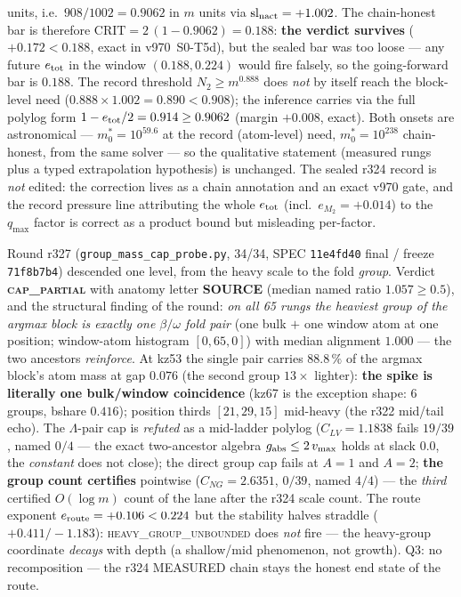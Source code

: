 \documentclass[11pt]{article}
\theoremstyle{definition}
\theoremstyle{remark}
\begin{document}
\begin{itemize}[leftmargin=2em]
units, i.e.\ $908/1002 = 0.9062$ in $m$ units via
$\mathrm{sl}_{\rm nact} = +1.002$.  The chain-honest bar is
therefore $\mathrm{CRIT} = 2\,(1 - 0.9062) = 0.188$:
\textbf{the verdict survives} ($+0.172 < 0.188$, exact in
v970~S0-T5d), but the sealed bar was too loose --- any future
$e_{\rm tot}$ in the window $(0.188, 0.224)$ would fire falsely,
so the going-forward bar is $0.188$.  The record threshold
$N_2 \ge m^{0.888}$ does \emph{not} by itself reach the
block-level need ($0.888 \times 1.002 = 0.890 < 0.908$); the
inference carries via the full polylog form $1 - e_{\rm tot}/2 =
0.914 \ge 0.9062$ (margin $+0.008$, exact).  Both onsets are
astronomical --- $m_0^* = 10^{59.6}$ at the record (atom-level)
need, $m_0^* = 10^{238}$ chain-honest, from the same solver ---
so the qualitative statement (measured rungs plus a typed
extrapolation hypothesis) is unchanged.  The sealed r324 record
is \emph{not} edited: the correction lives as a chain annotation
and an exact v970 gate, and the record pressure line attributing
the whole $e_{\rm tot}$ (incl.\ $e_{M_2} = +0.014$) to the
$q_{\max}$ factor is correct as a product bound but misleading
per-factor.
\end{itemize}

Round r327 (\texttt{group\_mass\_cap\_probe.py}, 34/34, SPEC
\texttt{11e4fd40} final / freeze \texttt{71f8b7b4}) descended one
level, from the heavy scale to the fold \emph{group}.  Verdict
\textbf{\textsc{cap\_partial}} with anatomy letter \textbf{SOURCE}
(median named ratio $1.057 \ge 0.5$), and the structural finding of
the round: \emph{on all 65 rungs the heaviest group of the argmax
block is exactly one $\beta/\omega$ fold pair} (one bulk $+$ one
window atom at one position; window-atom histogram $[0, 65, 0]$)
with median alignment $1.000$ --- the two ancestors
\emph{reinforce}.  At kz53 the single pair carries $88.8\,\%$ of the
argmax block's atom mass at gap $0.076$ (the second group $13\times$
lighter): \textbf{the spike is literally one bulk/window
coincidence} (kz67 is the exception shape: 6 groups, bshare
$0.416$); position thirds $[21, 29, 15]$ mid-heavy (the r322
mid/tail echo).  The $\Lambda$-pair cap is \emph{refuted} as a
mid-ladder polylog ($C_{LV} = 1.1838$ fails $19/39$, named $0/4$ ---
the exact two-ancestor algebra $g_{\rm abs} \le 2\,v_{\max}$ holds
at slack $0.0$, the \emph{constant} does not close); the direct
group cap fails at $A = 1$ and $A = 2$; \textbf{the group count
certifies} pointwise ($C_{NG} = 2.6351$, $0/39$, named $4/4$) ---
the \emph{third} certified $O(\log m)$ count of the lane after the
r324 scale count.  The route exponent $e_{\rm route} = +0.106 <
0.224$ but the stability halves straddle ($+0.411/-1.183$):
\textsc{heavy\_group\_unbounded} does \emph{not} fire --- the
heavy-group coordinate \emph{decays} with depth (a shallow/mid
phenomenon, not growth).  Q3: no recomposition --- the r324
MEASURED chain stays the honest end state of the route.
\end{document}
